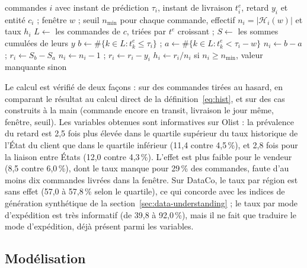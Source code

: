 \documentclass[11pt,a4paper]{article}
\theoremstyle{definition}
\begin{document}
\begin{algorithm}[!htbp]
\caption{Taux de retard historique sans fuite d'une entité}
\label{alg:historique}
\begin{algorithmic}[1]
\Require commandes $i$ avec instant de prédiction $\tau_i$, instant de livraison $t_i^{e}$, retard $y_i$ et entité $c_i$ ; fenêtre $w$ ; seuil $n_{\min}$
\Ensure pour chaque commande, effectif $n_i = |\mathcal{H}_i(w)|$ et taux $h_i$
  \State $L \gets$ les commandes de $c$, triées par $t^{e}$ croissant ; $S \gets$ les sommes cumulées de leurs $y$
    \State $b \gets \#\{k \in L : t_k^{e} \le \tau_i\}$ ; $a \gets \#\{k \in L : t_k^{e} < \tau_i - w\}$ 
    \State $n_i \gets b - a$ ; $r_i \gets S_b - S_a$
     
      \State $n_i \gets n_i - 1$ ; $r_i \gets r_i - y_i$
    \EndIf
    \State $h_i \gets r_i / n_i$ si $n_i \ge n_{\min}$, valeur manquante sinon
  \EndFor
\EndFor
\end{algorithmic}
\end{algorithm}

Le calcul est vérifié de deux façons : sur des commandes tirées au hasard, en comparant le résultat au calcul direct de la définition~\eqref{eq:hist}, et sur des cas construits à la main (commande encore en transit, livraison le jour même, fenêtre, seuil). Les variables obtenues sont informatives sur Olist : la prévalence du retard est 2,5 fois plus élevée dans le quartile supérieur du taux historique de l'État du client que dans le quartile inférieur (11,4 contre 4,5\,\%), et 2,8 fois pour la liaison entre États (12,0 contre 4,3\,\%). L'effet est plus faible pour le vendeur (8,5 contre 6,0\,\%), dont le taux manque pour 29\,\% des commandes, faute d'au moins dix commandes livrées dans la fenêtre. Sur DataCo, le taux par région est sans effet (57,0 à 57,8\,\% selon le quartile), ce qui concorde avec les indices de génération synthétique de la section~\ref{sec:data-understanding} ; le taux par mode d'expédition est très informatif (de 39,8 à 92,0\,\%), mais il ne fait que traduire le mode d'expédition, déjà présent parmi les variables.

\subsection{Modélisation}
\label{sec:modeling}
\end{document}
